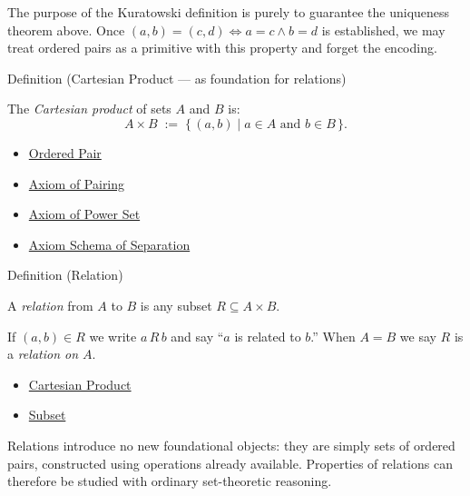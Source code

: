\begin{remark*}
The purpose of the Kuratowski definition is purely to guarantee the uniqueness
theorem above. Once $(a,b) = (c,d) \iff a=c \land b=d$ is established,
we may treat ordered pairs as a primitive with this property and forget the
encoding.
\end{remark*}

\begin{definitionbox}{Definition (Cartesian Product — as foundation for relations)}
\begin{definition}\label{def:cartesian-product-rel}
The \emph{Cartesian product} of sets $A$ and $B$ is:
\[
A \times B
\;:=\;
\{\, (a,b) \mid a \in A \text{ and } b \in B \,\}.
\]
\end{definition}
\end{definitionbox}

\begin{dependencies}
\begin{itemize}
  \item \hyperref[def:ordered-pair]{Ordered Pair}
  \item \hyperref[ax:pairing]{Axiom of Pairing}
  \item \hyperref[ax:power-set]{Axiom of Power Set}
  \item \hyperref[ax:separation]{Axiom Schema of Separation}
\end{itemize}
\end{dependencies}

\begin{definitionbox}{Definition (Relation)}
\begin{definition}[Relation]\label{def:relation}
A \emph{relation} from $A$ to $B$ is any subset $R \subseteq A \times B$.

If $(a,b) \in R$ we write $a \, R \, b$ and say ``$a$ is related to $b$.''
When $A = B$ we say $R$ is a \emph{relation on $A$}.
\end{definition}
\end{definitionbox}


\begin{dependencies}
\begin{itemize}
  \item \hyperref[def:cartesian-product-rel]{Cartesian Product}
  \item \hyperref[def:subset]{Subset}
\end{itemize}
\end{dependencies}

\begin{remark*}
Relations introduce no new foundational objects: they are simply sets of
ordered pairs, constructed using operations already available. Properties of
relations can therefore be studied with ordinary set-theoretic reasoning.
\end{remark*}

